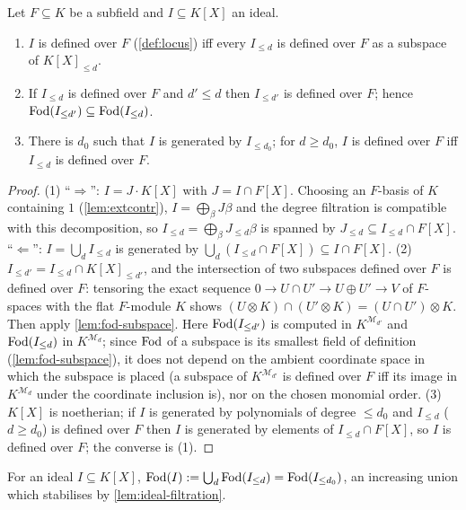\begin{lemma}\label{lem:ideal-filtration}
Let $F\subseteq K$ be a subfield and $I\subseteq K[X]$ an ideal.
\begin{enumerate}[nosep]
\item $I$ is defined over $F$ (\cref{def:locus}) iff every $I_{\le d}$ is defined over
  $F$ as a subspace of $K[X]_{\le d}$.
\item If $I_{\le d}$ is defined over $F$ and $d'\le d$ then $I_{\le d'}$ is defined over
  $F$; hence $\operatorname{Fod}(I_{\le d'})\subseteq\operatorname{Fod}(I_{\le d})$.
\item There is $d_0$ such that $I$ is generated by $I_{\le d_0}$; for $d\ge d_0$,
  $I$ is defined over $F$ iff $I_{\le d}$ is defined over $F$.
\end{enumerate}
\end{lemma}
\begin{proof}
(1) ``$\Rightarrow$'': $I=J\cdot K[X]$ with $J=I\cap F[X]$.  Choosing an $F$-basis of
$K$ containing $1$ (\cref{lem:extcontr}), $I=\bigoplus_\beta J\beta$ and the degree
filtration is compatible with this decomposition, so $I_{\le d}=\bigoplus_\beta J_{\le d}\beta$
is spanned by $J_{\le d}\subseteq I_{\le d}\cap F[X]$.  ``$\Leftarrow$'': $I=\bigcup_d I_{\le d}$
is generated by $\bigcup_d(I_{\le d}\cap F[X])\subseteq I\cap F[X]$.
(2) $I_{\le d'}=I_{\le d}\cap K[X]_{\le d'}$, and the intersection of two subspaces
defined over $F$ is defined over $F$: tensoring the exact sequence
$0\to U\cap U'\to U\oplus U'\to V$ of $F$-spaces with the flat $F$-module $K$ shows
$(U\otimes K)\cap(U'\otimes K)=(U\cap U')\otimes K$.  Then apply \cref{lem:fod-subspace}.
Here $\operatorname{Fod}(I_{\le d'})$ is computed in $K^{\mathcal M_{d'}}$ and $\operatorname{Fod}(I_{\le d})$ in
$K^{\mathcal M_d}$; since $\operatorname{Fod}$ of a subspace is its smallest field of definition
(\cref{lem:fod-subspace}), it does not depend on the ambient coordinate space in which
the subspace is placed (a subspace of $K^{\mathcal M_{d'}}$ is defined over $F$ iff its
image in $K^{\mathcal M_d}$ under the coordinate inclusion is), nor on the chosen
monomial order.
(3) $K[X]$ is noetherian; if $I$ is generated by polynomials of degree $\le d_0$ and
$I_{\le d}$ ($d\ge d_0$) is defined over $F$ then $I$ is generated by elements of
$I_{\le d}\cap F[X]$, so $I$ is defined over $F$; the converse is (1).
\end{proof}

\begin{definition}\label{def:fod}
For an ideal $I\subseteq K[X]$, $\operatorname{Fod}(I):=\bigcup_{d}\operatorname{Fod}(I_{\le d})=\operatorname{Fod}(I_{\le d_0})$,
an increasing union which stabilises by \cref{lem:ideal-filtration}.
\end{definition}


